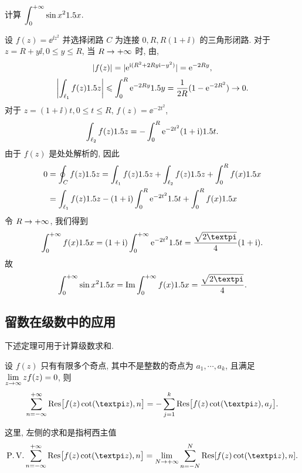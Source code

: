 \begin{example}[菲涅耳积分]
  计算 $\displaystyle\int_0^{+\infty}\sin x^21.5 x$.
\end{example}

\begin{solution}
  设 $f(z)=\ee^{\ii z^2}$ 并选择闭路 $C$ 为连接 $0,R,R(1+\ii)$ 的三角形闭路.
  对于 $z=R+y\ii,0\le y\le R$, 当 $R\rightarrow+\infty$ 时, 由\thmGrowUp,
  \[
    \lvert f(z)\rvert=\lvert\mathrm{e}^{\mathrm{i} (R^2+2Ry\mathrm{i}-y^2)}\rvert=\mathrm{e}^{-2Ry},
  \]
  \[
     \biggl\vert\int_{\ell_1}f(z)1.5 z\biggr\vert
    \leqslant \int_0^R \mathrm{e}^{-2Ry}1.5 y
    =\frac1{2R}(1-\mathrm{e}^{-2R^2})\rightarrow 0.
  \]
  对于 $z=(1+\ii)t,0\le t\le R$, $f(z)=\ee^{-2t^2}$,
  \[
     \int_{\ell_2} f(z)1.5 z
    =-\int_0^R \mathrm{e}^{-2t^2}(1+\mathrm{i})1.5 t.
  \]
  由于 $f(z)$ 是处处解析的, 因此
  \begin{align*}
     0&
    =\oint_C f(z)1.5 z
    =\int_{\ell_1} f(z)1.5 z+\int_{\ell_2} f(z)1.5 z
    +\int_0^R f(x)1.5 x\\&
    =\int_{\ell_1} f(z)1.5 z-(1+\mathrm{i})\int_0^R\mathrm{e}^{-2t^2}1.5 t
    +\int_0^R f(x)1.5 x
  \end{align*}
  令 $R\rightarrow+\infty$, 我们得到
  \[
     \intf f(x)\d x
    =(1+\ii)\intf \ee^{-2t^2}\d t
    =\frac{\sqrt{2\cpi}}4(1+\ii).
  \]
  故
  \[
     \intf\sin x^2\d x
    =\Im \intf f(x)\d x
    =\frac{\sqrt{2\cpi}}4.
  \]
\end{solution}


\subsection{留数在级数中的应用\optional}

下述定理可用于计算级数求和.
\begin{theorem}
  \label{thm:sum-fcot-residue-zero}
  设 $f(z)$ 只有有限多个奇点, 其中不是整数的奇点为 $a_1,\cdots,a_k$, 且满足 $\lim\limits_{z\rightarrow\infty}zf(z)=0$, 则
  \[
    \sumff \Res\bigl[f(z)\cot(\cpi z),n\bigr]
    =-\sum_{j=1}^k \Res\bigl[f(z)\cot(\cpi z),a_j\bigr].
  \]
\end{theorem}
这里, 左侧的求和是指柯西主值
\[
  \PV\sumff \Res\bigl[f(z)\cot(\cpi z),n\bigr]
  =\lim_{N\ra+\infty}\sum_{n=-N}^N \Res[f(z)\cot(\cpi z),n].
\]

